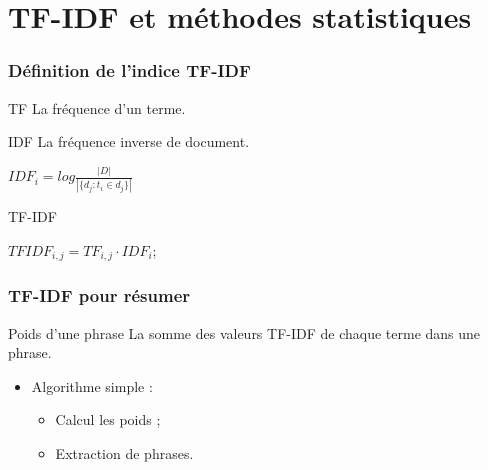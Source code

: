 \documentclass[12pt]{beamer}
\begin{document}
 
 


\section{TF-IDF et méthodes statistiques}

\begin{frame}
 \frametitle{Définition de l'indice TF-IDF}
 \begin{block}{TF}
 	La fréquence d'un terme.
 \end{block}
 
 \pause
 
 \begin{block}{IDF}
 	La fréquence inverse de document.\\
 	\begin{center}
 	 	$IDF_{i} =  log \frac{|D|}{|\{d_{j}: t_{i} \in d_{j}\}|}$
 	\end{center}
 \end{block}
 
 \pause
 
 \begin{block}{TF-IDF}
 	\begin{center}
 		$TFIDF_{i,j} = TF_{i,j} \cdot  IDF_{i}$;
 	\end{center}
 \end{block}

 
 \end{frame}

\begin{frame}
 \frametitle{TF-IDF pour résumer}
  \begin{block}{Poids d'une phrase}
 	La somme des valeurs TF-IDF de chaque terme dans une phrase.
 \end{block}
 
 \pause
 
 \begin{itemize}
  \item Algorithme simple :
  	\begin{itemize}
  	\item Calcul les poids ;
  	\item Extraction de phrases.
  	\end{itemize}
 \end{itemize}

 
\end{frame}
\end{document}
